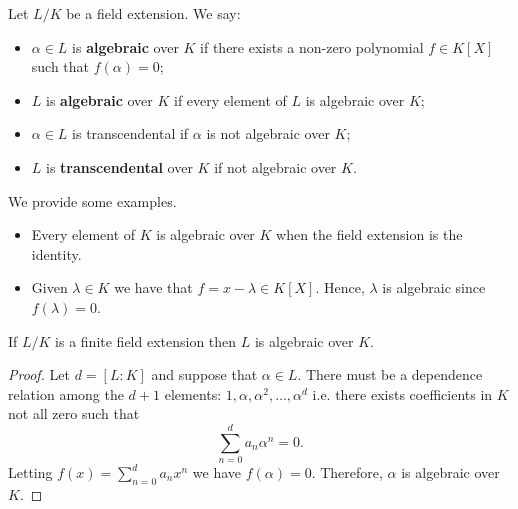 \documentclass[12pt, a4paper]{article}
\begin{document}
\begin{definition}
    Let \(L/K\) be a field extension. We say:
    \begin{itemize}
        \item \(\alpha \in L\) is \textbf{algebraic} over \(K\) if there exists a non-zero polynomial \(f \in K[X]\) such that \(f(\alpha)=0\);
        \item \(L\) is \textbf{algebraic} over \(K\) if every element of \(L\) is algebraic over \(K\);
        \item \(\alpha\in L\) is transcendental if \(\alpha\) is not algebraic over \(K\);
        \item \(L\) is \textbf{transcendental} over \(K\) if not algebraic over \(K\).
    \end{itemize}
\end{definition}

\begin{mdexample}
    We provide some examples.
    \begin{itemize}
        \item Every element of \(K\) is algebraic over \(K\) when the field extension is the identity.
        \item Given \(\lambda \in K\) we have that \(f=x-\lambda\in K[X]\). Hence, \(\lambda\) is algebraic since \(f(\lambda)=0\).
    \end{itemize}
\end{mdexample}

\begin{mdprop}
    If \(L/K\) is a finite field extension then \(L\) is algebraic over \(K\).
\end{mdprop}

\begin{proof}
    Let \(d=[L:K]\) and suppose that \(\alpha \in L\). There must be a dependence relation among the \(d+1\) elements: \(1,\alpha,\alpha^2,\ldots,\alpha^d\) i.e. there exists coefficients in \(K\) not all zero such that 
    \[\sum_{n=0}^d a_n \alpha^n =0.\]
    Letting \(f(x)= \sum_{n=0}^d a_n x^n\) we have \(f(\alpha)=0\). Therefore, \(\alpha\) is algebraic over \(K\). 
\end{proof}
\end{document}
